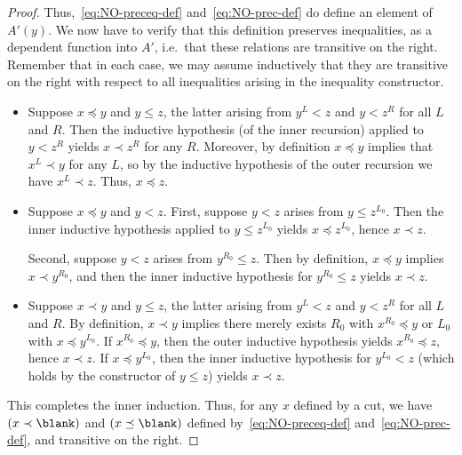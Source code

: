 \begin{proof}
  Thus,~\eqref{eq:NO-preceq-def} and~\eqref{eq:NO-prec-def} do define an element of $A'(y)$.
  We now have to verify that this definition preserves inequalities, as a dependent function into $A'$, i.e.\ that these relations are transitive on the right.
  Remember that in each case, we may assume inductively that they are transitive on the right with respect to all inequalities arising in the inequality constructor.
  \begin{itemize}
  \item Suppose $x\preceq y$ and $y\le z$, the latter arising from $y^L<z$ and $y<z^R$ for all $L$ and $R$.
    Then the inductive hypothesis (of the inner recursion) applied to $y<z^R$ yields $x\prec z^R$ for any $R$.
    Moreover, by definition $x\preceq y$ implies that $x^L \prec y$ for any $L$, so by the inductive hypothesis of the outer recursion we have $x^L \prec z$.
    Thus, $x\preceq z$.
  \item Suppose $x\preceq y$ and $y<z$.
    First, suppose $y<z$ arises from $y\le z^{L_0}$.
    Then the inner inductive hypothesis applied to $y\le z^{L_0}$ yields $x \preceq z^{L_0}$, hence $x\prec z$.

    Second, suppose $y<z$ arises from $y^{R_0}\le z$.
    Then by definition, $x\preceq y$ implies $x\prec y^{R_0}$, and then the inner inductive hypothesis for $y^{R_0}\le z$ yields $x\prec z$.
  \item Suppose $x\prec y$ and $y\le z$, the latter arising from $y^L<z$ and $y<z^R$ for all $L$ and $R$.
    By definition, $x\prec y$ implies there merely exists $R_0$ with $x^{R_0}\preceq y$ or $L_0$ with $x\preceq y^{L_0}$.
    If $x^{R_0}\preceq y$, then the outer inductive hypothesis yields $x^{R_0}\preceq z$, hence $x\prec z$.
    If $x\preceq y^{L_0}$, then the inner inductive hypothesis for $y^{L_0}<z$ (which holds by the constructor of $y\le z$) yields $x\prec z$.

  \end{itemize}
  This completes the inner induction.
  Thus, for any $x$ defined by a cut, we have $(x\prec \blank)$ and $(x\preceq \blank)$ defined by~\eqref{eq:NO-preceq-def} and~\eqref{eq:NO-prec-def}, and transitive on the right.


\end{proof}
